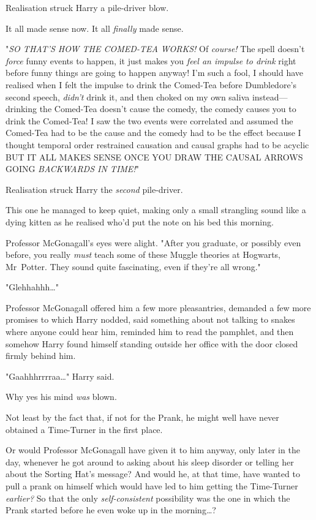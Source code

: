 Realisation struck Harry a pile-driver blow.

It all made sense now. It all \emph{finally} made sense.

"\emph{SO THAT'S HOW THE COMED-TEA WORKS!} Of \emph{course!} The spell doesn't
\emph{force} funny events to happen, it just makes you \emph{feel an impulse to
drink} right before funny things are going to happen anyway! I'm such a fool, I
should have realised when I felt the impulse to drink the Comed-Tea before
Dumbledore's second speech, \emph{didn't} drink it, and then choked on my own
saliva instead---drinking the Comed-Tea doesn't cause the comedy, the comedy
causes you to drink the Comed-Tea! I saw the two events were correlated and
assumed the Comed-Tea had to be the cause and the comedy had to be the effect
because I thought temporal order restrained causation and causal graphs had to
be acyclic BUT IT ALL MAKES SENSE ONCE YOU DRAW THE CAUSAL ARROWS GOING
\emph{BACKWARDS IN TIME!}"

Realisation struck Harry the \emph{second} pile-driver.

This one he managed to keep quiet, making only a small strangling sound like a
dying kitten as he realised who'd put the note on his bed this morning.

Professor McGonagall's eyes were alight. "After you graduate, or possibly even
before, you really \emph{must} teach some of these Muggle theories at Hogwarts,
Mr~Potter. They sound quite fascinating, even if they're all wrong."

"Glehhahhh…"

Professor McGonagall offered him a few more pleasantries, demanded a few more
promises to which Harry nodded, said something about not talking to snakes
where anyone could hear him, reminded him to read the pamphlet, and then
somehow Harry found himself standing outside her office with the door closed
firmly behind him.

"Gaahhhrrrraa…" Harry said.

Why yes his mind \emph{was} blown.

Not least by the fact that, if not for the Prank, he might well have never
obtained a Time-Turner in the first place.

Or would Professor McGonagall have given it to him anyway, only later in the
day, whenever he got around to asking about his sleep disorder or telling her
about the Sorting Hat's message? And would he, at that time, have wanted to
pull a prank on himself which would have led to him getting the Time-Turner
\emph{earlier?} So that the only \emph{self-consistent} possibility was the one
in which the Prank started before he even woke up in the morning…?

